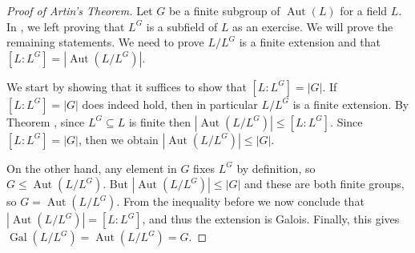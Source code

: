 \documentclass[12pt]{report}
\numberwithin{equation}{section}
\numberwithin{theorem}{chapter}
\theoremstyle{definition}
\newtheorem*{basic properties}{Basic Properties}
\newtheorem*{Important Remark}{Important Remark}
\DeclareMathOperator{\Gal}{Gal}
\DeclareMathOperator{\Aut}{Aut}
\begin{document}
\begin{proof}[Proof of Artin's Theorem] 
Let $G$ be a finite subgroup of $\Aut(L)$ for a field $L$. In , we left proving that $L^G$ is a subfield of $L$ as an exercise. We will prove the remaining statements. We need to prove $L/L^G$ is a finite extension and that $[L:L^G] = |\Aut(L/L^G)|$.

We start by showing that it suffices to show that $[L: L^G] = |G|$. If $[L: L^G] = |G|$ does indeed hold, then in particular $L/L^G$ is a finite extension. By Theorem , since $L^G \subseteq L$ is finite then $|\Aut(L/L^G)| \leqslant [L:L^G]$. Since $[L: L^G] = |G|$, then we obtain $|\Aut(L/L^G)| \leqslant |G|$.

On the other hand, any element in $G$ fixes $L^G$ by definition, so $G \leq \Aut(L/L^G)$. But $|\Aut(L/L^G)| \leqslant |G|$ and these are both finite groups, so $G = \Aut(L/L^G)$. From the inequality before we now conclude that $|\Aut(L/L^G)| = [L:L^G]$, and thus the extension is Galois. Finally, this gives $\Gal(L/L^G) = \Aut(L/L^G) = G$.



\end{proof}
\end{document}
